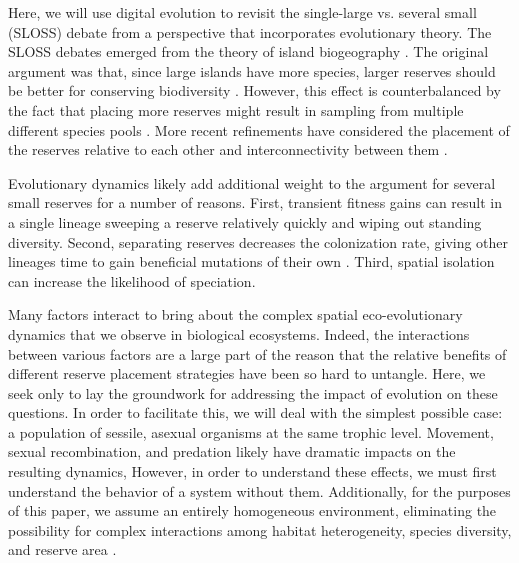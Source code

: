 \documentclass[letterpaper]{article}
\begin{document}
    Here, we will use digital evolution to revisit the single-large vs. several small (SLOSS) debate from a perspective that incorporates evolutionary theory. The SLOSS debates emerged from the theory of island biogeography \citep{macarthur_theory_1967}. The original argument was that, since large islands have more species, larger reserves should be better for conserving biodiversity \citep{diamond_island_1975}. However, this effect is counterbalanced by the fact that placing more reserves might result in sampling from multiple different species pools \citep{simberloff_island_1976}. More recent refinements have considered the placement of the reserves relative to each other and interconnectivity between them \citep{saunders_biological_1991,tjorve_how_2010}. 

	Evolutionary dynamics likely add additional weight to the argument for several small reserves for a number of reasons. First, transient fitness gains can result in a single lineage sweeping a reserve relatively quickly and wiping out standing diversity. Second, separating reserves decreases the colonization rate, giving other lineages time to gain beneficial mutations of their own \citep{whitley_island_1998,tomassini_spatially_2005}. Third, spatial isolation can increase the likelihood of speciation.
%
%
%
%
%
%
%

	Many factors interact to bring about the complex spatial eco-evolutionary dynamics that we observe in biological ecosystems. Indeed, the interactions between various factors are a large part of the reason that the relative benefits of different reserve placement strategies have been so hard to untangle. Here, we seek only to lay the groundwork for addressing the impact of evolution on these questions. In order to facilitate this, we will deal with the simplest possible case: a population of sessile, asexual organisms at the same trophic level. Movement, sexual recombination, and predation likely have dramatic impacts on the resulting dynamics, However, in order to understand these effects, we must first understand the behavior of a system without them. Additionally, for the purposes of this paper, we assume an entirely homogeneous environment, eliminating the possibility for complex interactions among habitat heterogeneity, species diversity, and reserve area \citep{kadmon_integrating_2007}.
\end{document}
